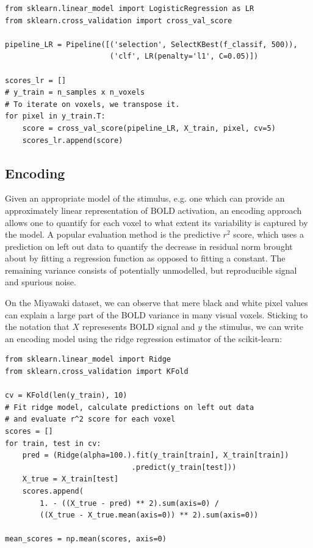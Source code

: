 \documentclass{frontiersSCNS} %
\begin{document}
\begin{lstlisting}
from sklearn.linear_model import LogisticRegression as LR
from sklearn.cross_validation import cross_val_score

pipeline_LR = Pipeline([('selection', SelectKBest(f_classif, 500)),
                        ('clf', LR(penalty='l1', C=0.05)])

scores_lr = []
# y_train = n_samples x n_voxels
# To iterate on voxels, we transpose it.
for pixel in y_train.T:
    score = cross_val_score(pipeline_LR, X_train, pixel, cv=5)
    scores_lr.append(score)
\end{lstlisting}




\subsection{Encoding}
Given an appropriate model of the stimulus, e.g. one which can provide an
approximately linear representation of BOLD activation, an encoding approach
allows one to quantify for each voxel to what extent its variability is captured
by the model. A popular evaluation method is the predictive \(r^2\) score, which
uses a prediction on left out data to quantify the decrease in residual norm 
brought about by fitting a regression function as opposed to fitting a constant. 
The remaining variance consists of potentially unmodelled, but reproducible signal
and spurious noise.

On the Miyawaki dataset, we can observe that mere black and white pixel values
can explain a large part of the BOLD variance in many visual voxels. Sticking
to the notation that \(X\) represesents BOLD signal and \(y\) the stimulus, we
can write an encoding model using the ridge regression estimator of the scikit-learn:

\begin{lstlisting}
from sklearn.linear_model import Ridge
from sklearn.cross_validation import KFold

cv = KFold(len(y_train), 10)
# Fit ridge model, calculate predictions on left out data
# and evaluate r^2 score for each voxel
scores = []
for train, test in cv:
    pred = (Ridge(alpha=100.).fit(y_train[train], X_train[train])
                             .predict(y_train[test]))
    X_true = X_train[test]
    scores.append(
        1. - ((X_true - pred) ** 2).sum(axis=0) /
        ((X_true - X_true.mean(axis=0)) ** 2).sum(axis=0))

mean_scores = np.mean(scores, axis=0)
\end{lstlisting}
\end{document}
